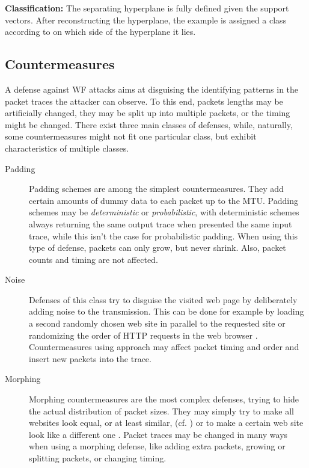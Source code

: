 \documentclass[
	ruledheaders=chapter,
	class=report,
	thesis={type=master, department=inf},
	accentcolor=1c,
	custommargins=true,
	marginpar=false,
	parskip=half-,
	fontsize=11pt,
]{tudapub}
\begin{document}
	\textbf{Classification:} The separating hyperplane is fully defined given the support vectors. After reconstructing the hyperplane, the example is assigned a class according to on which side of the hyperplane it lies.

	\subsection{Countermeasures}
	\label{theoretical:defenses}

	A defense against WF attacks aims at disguising the identifying patterns in the packet traces the attacker can observe. To this end, packets lengths may be artificially changed, they may be split up into multiple packets, or the timing might be changed. There exist three main classes of defenses, while, naturally, some countermeasures might not fit one particular class, but exhibit characteristics of multiple classes.
	
	\begin{description}
		\item[Padding] Padding schemes are among the simplest countermeasures. They add certain amounts of dummy data to each packet up to the MTU. Padding schemes may be \textit{deterministic} or \textit{probabilistic}, with deterministic schemes always returning the same output trace when presented the same input trace, while this isn't the case for probabilistic padding. When using this type of defense, packets can only grow, but never shrink. Also, packet counts and timing are not affected.
		\item[Noise] Defenses of this class try to disguise the visited web page by deliberately adding noise to the transmission. This can be done for example by loading a second randomly chosen web site in parallel to the requested site \cite{Panchenko2011} or randomizing the order of HTTP requests in the web browser \cite{Perry2011}. Countermeasures using approach may affect packet timing and order and insert new packets into the trace.
		\item[Morphing] Morphing countermeasures are the most complex defenses, trying to hide the actual distribution of packet sizes. They may simply try to make all websites look equal, or at least similar, (cf. \cite{Dyer2012,Cai2014,Cai2014a}) or to make a certain web site look like a different one \cite{Wright2009}. Packet traces may be changed in many ways when using a morphing defense, like adding extra packets, growing or splitting packets, or changing timing.
	\end{description}
	
\end{document}

